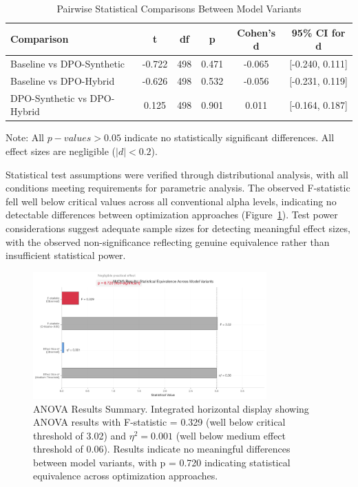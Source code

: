 \begin{table}[H]
\centering
\caption{Pairwise Statistical Comparisons Between Model Variants}
\label{tab:statistical-comparisons}
\begin{tabular}{lccccc}
\toprule
\textbf{Comparison} & \textbf{t} & \textbf{df} & \textbf{p} & \textbf{Cohen's d} & \textbf{95\% CI for d} \\
\midrule
Baseline vs DPO-Synthetic    & -0.722 & 498 & 0.471 & -0.065 & [-0.240, 0.111] \\
Baseline vs DPO-Hybrid       & -0.626 & 498 & 0.532 & -0.056 & [-0.231, 0.119] \\
DPO-Synthetic vs DPO-Hybrid  & 0.125 & 498 & 0.901 & 0.011 & [-0.164, 0.187] \\
\bottomrule
\end{tabular}
\begin{tablenotes}
\small
\item Note: All $p-values > 0.05$ indicate no statistically significant differences. All effect sizes are negligible ($|d| < 0.2$).
\end{tablenotes}
\end{table}

Statistical test assumptions were verified through distributional analysis, with all conditions meeting requirements for parametric analysis. The observed F-statistic fell well below critical values across all conventional alpha levels, indicating no detectable differences between optimization approaches (Figure~\ref{fig:anova-summary}). Test power considerations suggest adequate sample sizes for detecting meaningful effect sizes, with the observed non-significance reflecting genuine equivalence rather than insufficient statistical power.

\begin{figure}[H]
\centering
\includegraphics[width=0.8\textwidth]{figures/anova_summary.png}
\caption[ANOVA Results Summary]{ANOVA Results Summary. Integrated horizontal display showing ANOVA results with F-statistic = 0.329 (well below critical threshold of 3.02) and $\eta^2 = 0.001$ (well below medium effect threshold of 0.06). Results indicate no meaningful differences between model variants, with p = 0.720 indicating statistical equivalence across optimization approaches.}
\label{fig:anova-summary}
\end{figure}


